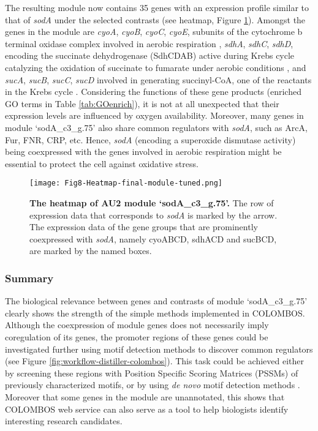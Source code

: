 The resulting module now contains 35 genes with an expression profile similar to that of \textit{sodA} under the selected contrasts (see heatmap, Figure \ref{fig:colombos-heatmap-final}).  Amongst the genes in the module are \textit{cyoA}, \textit{cyoB}, \textit{cyoC}, \textit{cyoE}, subunits of the cytochrome b terminal oxidase complex involved in aerobic respiration \cite{Cotter1992}, \textit{sdhA}, \textit{sdhC}, \textit{sdhD}, encoding the succinate dehydrogenase (SdhCDAB) active during Krebs cycle catalyzing the oxidation of succinate to fumarate under aerobic conditions \cite{Wilde1986}, and \textit{sucA}, \textit{sucB}, \textit{sucC}, \textit{sucD} involved in generating succinyl-CoA, one of the reactants in the Krebs cycle \cite{Buck1989}. Considering the functions of these gene products (enriched GO terms in Table \ref{tab:GOenrich}), it is not at all unexpected that their expression levels are influenced by oxygen availability.  Moreover, many genes in module `sodA\_c3\_g.75' also share common regulators with \textit{sodA}, such as ArcA, Fur, FNR, CRP, etc. Hence, \textit{sodA} (encoding a superoxide dismutase activity) being coexpressed with the genes involved in aerobic respiration might be essential to protect the cell against oxidative stress.

\begin{figure}[tb]
	\centering
  	\texttt{[image: Fig8-Heatmap-final-module-tuned.png]}
	\caption[COLOMBOS heatmap of module `sodA\_c3\_g.75']{
	\textbf{The heatmap of AU2 module `sodA\_c3\_g.75'.}
	The row of expression data that corresponds to \textit{sodA} is
	marked by the arrow. The expression data of the gene groups that are 
	prominently coexpressed with \textit{sodA}, namely cyoABCD, sdhACD and 
	sucBCD, are marked by the named boxes.}
	\label{fig:colombos-heatmap-final}
\end{figure}


\subsubsection{Summary}

The biological relevance between genes and contrasts of module `sodA\_c3\_g.75' clearly shows the strength of the simple methods implemented in COLOMBOS. Although the coexpression of module genes does not necessarily imply coregulation of its genes,  the promoter regions of these genes could be investigated further using motif detection methods to discover common regulators (see Figure \ref{fig:workflow-distiller-colombos}). This task could be achieved either by screening these regions with Position Specific Scoring Matrices (PSSMs) of previously characterized motifs, or by using \textit{de novo} motif detection methods \cite{Tompa2005, Storms2010}. Moreover that some genes in the module are unannotated, this shows that COLOMBOS web service can also serve as a tool to help biologists identify interesting research candidates.




